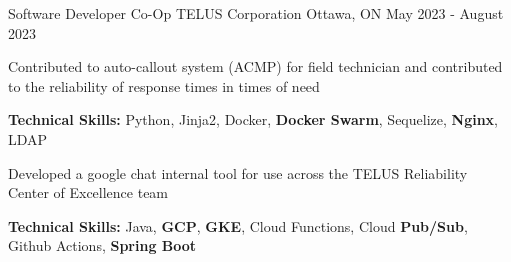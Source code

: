 \begin{cventries}
  \cventry
    {Software Developer Co-Op} %
    {TELUS Corporation} %
    {Ottawa, ON} %
    {May 2023 - August 2023} %
    {
      \begin{cvitems} %
        \item {Contributed to auto-callout system (ACMP) for field technician and contributed to the reliability of response times in times of need}
          \item[] {\textbf{Technical Skills:} Python, Jinja2, Docker, \textbf{Docker Swarm}, Sequelize, \textbf{Nginx}, LDAP}
        \item {Developed a google chat internal tool for use across the TELUS Reliability Center of Excellence team}
          \item[] {\textbf{Technical Skills:} Java, \textbf{GCP}, \textbf{GKE}, Cloud Functions, Cloud \textbf{Pub/Sub}, Github Actions, \textbf{Spring Boot}}
      \end{cvitems}
    }

\end{cventries}

